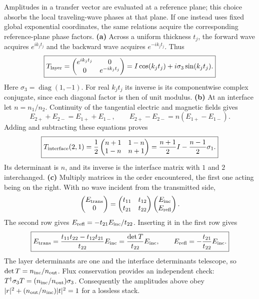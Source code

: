 \solution
Amplitudes in a transfer vector are evaluated at a reference plane;
this choice absorbs the local traveling-wave phases at that plane.
If one instead uses fixed global exponential coordinates, the same
relations acquire the corresponding reference-plane phase factors.
\textbf{(a)} Across a uniform thickness $t_j$, the forward wave
acquires $e^{ik_jt_j}$ and the backward wave acquires
$e^{-ik_jt_j}$. Thus
\[
\boxed{T_{\rm layer}=\begin{pmatrix}e^{ik_jt_j}&0\\0&e^{-ik_jt_j}\end{pmatrix}
=I\cos(k_jt_j)+i\sigma_3\sin(k_jt_j).}
\]
Here $\sigma_3=\operatorname{diag}(1,-1)$.
For real $k_jt_j$ its inverse is its componentwise complex
conjugate, since each diagonal factor is then of unit modulus.
\textbf{(b)} At an interface let $n=n_1/n_2$.
Continuity of the tangential electric and magnetic fields gives
\[
E_{2+}+E_{2-}=E_{1+}+E_{1-},\qquad
E_{2+}-E_{2-}=n(E_{1+}-E_{1-}).
\]
Adding and subtracting these equations proves
\[
\boxed{T_{\rm interface}(2,1)=\frac12
 \begin{pmatrix}n+1&1-n\\1-n&n+1\end{pmatrix}
=\frac{n+1}{2}I-\frac{n-1}{2}\sigma_1.}
\]
Its determinant is $n$, and its inverse is the interface matrix with
$1$ and $2$ interchanged.
\textbf{(c)} Multiply matrices in the order encountered, the first
one acting being on the right. With no wave incident from the
transmitted side,
\[
\begin{pmatrix}E_{\rm trans}\\0\end{pmatrix}
=\begin{pmatrix}t_{11}&t_{12}\\t_{21}&t_{22}\end{pmatrix}
 \begin{pmatrix}E_{\rm inc}\\E_{\rm refl}\end{pmatrix}.
\]
The second row gives $E_{\rm refl}=-t_{21}E_{\rm inc}/t_{22}$.
Inserting it in the first row gives
\[
\boxed{E_{\rm trans}=\frac{t_{11}t_{22}-t_{12}t_{21}}{t_{22}}E_{\rm inc}
=\frac{\det T}{t_{22}}E_{\rm inc},\qquad
E_{\rm refl}=-\frac{t_{21}}{t_{22}}E_{\rm inc}.}
\]
The layer determinants are one and the interface determinants
 telescope, so $\det T=n_{\rm inc}/n_{\rm out}$.
Flux conservation provides an independent check:
$T^\dagger\sigma_3T=(n_{\rm inc}/n_{\rm out})\sigma_3$.
Consequently the amplitudes above obey
$|r|^2+(n_{\rm out}/n_{\rm inc})|t|^2=1$ for a lossless stack.

